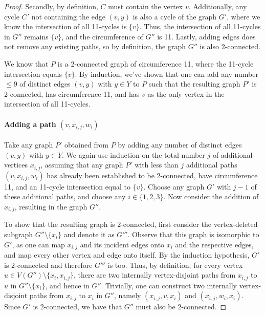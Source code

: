 \begin{proof}
Secondly, by definition, $C$ must contain the vertex $v$. Additionally, any cycle $C'$ not containing the edge $(v,y)$ is also a cycle of the graph $G'$, where we know the intersection of all 11-cycles is $\{v\}$. Thus, the intersection of all 11-cycles in $G''$ remains $\{v\}$, and the circumference of $G''$ is 11. Lastly, adding edges does not remove any existing paths, so by definition, the graph $G''$ is also 2-connected.

We know that $P$ is a 2-connected graph of circumference 11, where the 11-cycle intersection equals $\{v\}$. By induction, we've shown that one can add any number $\le 9$ of distinct edges $(v,y)$ with $y \in Y$ to $P$ such that the resulting graph $P'$ is 2-connected, has circumference 11, and has $v$ as the only vertex in the intersection of all 11-cycles.

\paragraph{Adding a path $(v, x_{i,j}, w_i)$}
Take any graph $P'$ obtained from $P$ by adding any number of distinct
edges $(v,y)$ with $y \in Y$. We again use induction on the total number $j$ of additional vertices $x_{i,j}$, assuming that any graph $P'$ with less than $j$ additional paths $(v, x_{i,j}, w_i)$ has already been established to be 2-connected, have circumference 11, and an 11-cycle intersection equal to $\{v\}$. Choose any graph $G'$ with $j-1$ of these additional paths, and choose any $i\in\{1,2,3\}$. Now consider the addition of $x_{i,j}$, resulting in the graph $G''$.

To show that the resulting graph is $2$-connected, first consider the vertex-deleted subgraph $G'' \setminus \{x_i\}$ and denote it as $G'''$. Observe that this graph is isomorphic to $G'$, as one can map $x_{i,j}$ and its incident edges onto $x_i$ and the respective edges, and map every other vertex and edge onto itself. By the induction hypothesis, $G'$ is $2$-connected and therefore $G'''$ is too. Thus, by definition, for every vertex $u\in V(G'')\setminus\{x_i,x_{i,j}\}$, there are two internally vertex-disjoint paths from $x_{i,j}$ to $u$ in $G''\setminus\{x_i\}$, and hence in $G''$. Trivially, one can construct two internally vertex-disjoint paths from $x_{i,j}$ to $x_i$ in $G''$, namely $(x_{i,j},v,x_i)$ and $(x_{i,j},w_i,x_i)$. Since $G'$ is 2-connected, we have that $G''$ must also be 2-connected.


\end{proof}
